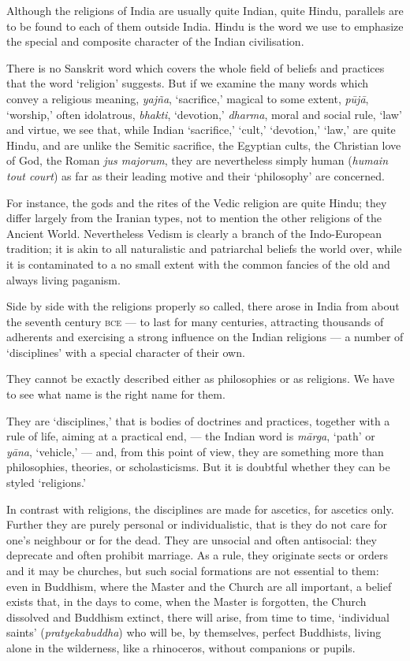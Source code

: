 \documentclass[a4paper, 11pt, oneside, english]{article}
\begin{document}
Although the religions of India are usually quite Indian, quite Hindu, parallels are to be found to each of them outside India. Hindu is the word we use to emphasize the special and composite character of the Indian civilisation.

There is no Sanskrit word which covers the whole field of beliefs and practices that the word `religion' suggests. But if we examine the many words which convey a religious meaning, \emph{yajña}, `sacrifice,' magical to some extent, \emph{pūjā}, `worship,' often idolatrous, \emph{bhakti}, `devotion,' \emph{dharma}, moral and social rule, `law' and virtue, we see that, while Indian `sacrifice,' `cult,' `devotion,' `law,' are quite Hindu, and are unlike the Semitic sacrifice, the Egyptian cults, the Christian love of God, the Roman \emph{jus majorum}, they are nevertheless simply human (\emph{humain tout court}) as far as their leading motive and their `philosophy' are concerned.

For instance, the gods and the rites of the Vedic religion are quite Hindu; they differ largely from the Iranian types, not to mention the other religions of the Ancient World. Nevertheless Vedism is clearly a branch of the Indo-European tradition; it is akin to all naturalistic and patriarchal beliefs the world over, while it is contaminated to a no small extent with the common fancies of the old and always living paganism.

Side by side with the religions properly so called, there arose in India from about the seventh century \textsc{bce} --- to last for many centuries, attracting thousands of adherents and exercising a strong influence on the Indian religions --- a number of `disciplines' with a special character of their own.

They cannot be exactly described either as philosophies or as religions. We have to see what name is the right name for them.

They are `disciplines,' that is bodies of doctrines and practices, together with a rule of life, aiming at a practical end, --- the Indian word is \emph{mārga}, `path' or \emph{yāna}, `vehicle,' --- and, from this point of view, they are something more than philosophies, theories, or scholasticisms. But it is doubtful whether they can be styled `religions.'

In contrast with religions, the disciplines are made for ascetics, for ascetics only. Further they are purely personal or individualistic, that is they do not care for one's neighbour or for the dead. They are unsocial and often antisocial: they deprecate and often prohibit marriage. As a rule, they originate sects or orders and it may be churches, but such social formations are not essential to them: even in Buddhism, where the Master and the Church are all important, a belief exists that, in the days to come, when the Master is forgotten, the Church dissolved and Buddhism extinct, there will arise, from time to time, `individual saints' (\emph{pratyekabuddha}) who will be, by themselves, perfect Buddhists, living alone in the wilderness, like a rhinoceros, without companions or pupils.
\end{document}
